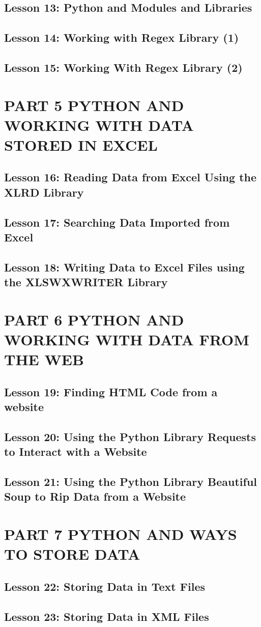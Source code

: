 \documentclass[11pt]{article}
\begin{document}
\subsection{Lesson 13: Python and Modules and Libraries}
\label{sec:orgbcb6844}
\subsection{Lesson 14: Working with Regex Library (1)}
\label{sec:orgb70bcfc}
\subsection{Lesson 15: Working With Regex Library (2)}
\label{sec:org4f825f5}
\section{PART 5 PYTHON AND WORKING WITH DATA STORED IN EXCEL}
\label{sec:orgc4d2563}
\subsection{Lesson 16: Reading Data from Excel Using the XLRD Library}
\label{sec:org24434e2}
\subsection{Lesson 17: Searching Data Imported from Excel}
\label{sec:org95f2761}
\subsection{Lesson 18: Writing Data to Excel Files using the XLSWXWRITER Library}
\label{sec:orgcd56492}
\section{PART 6 PYTHON AND WORKING WITH DATA FROM THE WEB}
\label{sec:org4b60836}
\subsection{Lesson 19: Finding HTML Code from a website}
\label{sec:org80bbb17}
\subsection{Lesson 20: Using the Python Library Requests to Interact with a Website}
\label{sec:orga973bc4}
\subsection{Lesson 21: Using the Python Library Beautiful Soup to Rip Data from a Website}
\label{sec:org5767f85}
\section{PART 7 PYTHON AND WAYS TO STORE DATA}
\label{sec:orgf54c460}
\subsection{Lesson 22: Storing Data in Text Files}
\label{sec:orge98be32}
\subsection{Lesson 23: Storing Data in XML Files}
\label{sec:orge78176c}
\end{document}
